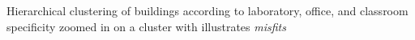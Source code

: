 Hierarchical clustering of buildings according to laboratory, office, and classroom specificity zoomed in on a cluster with illustrates \emph{misfits}
\label{fig:specificity_misfit}